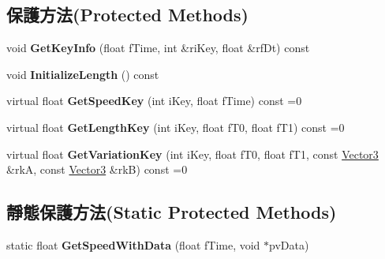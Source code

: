 \subsection*{保護方法(Protected Methods)}
\begin{DoxyCompactItemize}
\item 
void {\bfseries Get\+Key\+Info} (float f\+Time, int \&ri\+Key, float \&rf\+Dt) const \hypertarget{class_i_dream_sky_1_1_multiple_curve3_a8cb4c0cc7c67c8f0550c64f2aa839993}{}\label{class_i_dream_sky_1_1_multiple_curve3_a8cb4c0cc7c67c8f0550c64f2aa839993}

\item 
void {\bfseries Initialize\+Length} () const \hypertarget{class_i_dream_sky_1_1_multiple_curve3_a8ca4765d98eccfdf2efa494c96e056f2}{}\label{class_i_dream_sky_1_1_multiple_curve3_a8ca4765d98eccfdf2efa494c96e056f2}

\item 
virtual float {\bfseries Get\+Speed\+Key} (int i\+Key, float f\+Time) const  =0\hypertarget{class_i_dream_sky_1_1_multiple_curve3_af4873fd3fe5ec9a7275939c10a193fdf}{}\label{class_i_dream_sky_1_1_multiple_curve3_af4873fd3fe5ec9a7275939c10a193fdf}

\item 
virtual float {\bfseries Get\+Length\+Key} (int i\+Key, float f\+T0, float f\+T1) const  =0\hypertarget{class_i_dream_sky_1_1_multiple_curve3_adf52aafc0b7a24c1b39ab5c2ab0655c5}{}\label{class_i_dream_sky_1_1_multiple_curve3_adf52aafc0b7a24c1b39ab5c2ab0655c5}

\item 
virtual float {\bfseries Get\+Variation\+Key} (int i\+Key, float f\+T0, float f\+T1, const \hyperlink{class_i_dream_sky_1_1_vector3}{Vector3} \&rkA, const \hyperlink{class_i_dream_sky_1_1_vector3}{Vector3} \&rkB) const  =0\hypertarget{class_i_dream_sky_1_1_multiple_curve3_af873a522febed79006ae0c085e0ef8f5}{}\label{class_i_dream_sky_1_1_multiple_curve3_af873a522febed79006ae0c085e0ef8f5}

\end{DoxyCompactItemize}
\subsection*{靜態保護方法(Static Protected Methods)}
\begin{DoxyCompactItemize}
\item 
static float {\bfseries Get\+Speed\+With\+Data} (float f\+Time, void $\ast$pv\+Data)\hypertarget{class_i_dream_sky_1_1_multiple_curve3_a08d09b483e219b216462973c343c55e6}{}\label{class_i_dream_sky_1_1_multiple_curve3_a08d09b483e219b216462973c343c55e6}

\end{DoxyCompactItemize}
